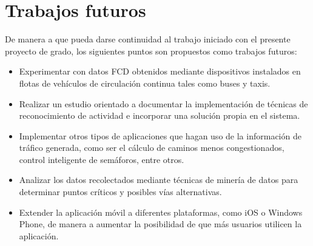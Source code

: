 \section{Trabajos futuros}

De manera a que pueda darse continuidad al trabajo iniciado con el presente proyecto de grado, los siguientes puntos son propuestos como trabajos futuros:

\begin{itemize}

\item Experimentar con datos FCD obtenidos mediante dispositivos  instalados en flotas de vehículos de circulación continua tales como buses y taxis.

\item Realizar un estudio orientado a documentar la implementación de técnicas de reconocimiento de actividad e incorporar una solución propia en el sistema.

\item Implementar otros tipos de aplicaciones que hagan uso de la información de tráfico generada, como ser el cálculo de caminos menos congestionados, control inteligente de semáforos, entre otros.

\item Analizar los datos recolectados mediante técnicas de minería de datos para determinar puntos críticos y posibles vías alternativas.

\item Extender la aplicación móvil a diferentes plataformas, como iOS o Windows Phone, de manera a aumentar la posibilidad de que más usuarios utilicen la aplicación.



\end{itemize}

